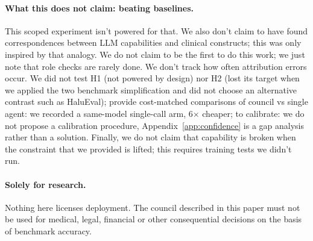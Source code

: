 \paragraph{What this does not claim: beating baselines.}
This scoped experiment isn't powered for that. We also don't claim to have found correspondences
between LLM capabilities and clinical constructs; this was only inspired by that analogy. We do not
claim to be the first to do this work; we just note that role checks are rarely done. We don't track
how often attribution errors occur. We did not test H1 (not powered by design) nor H2 (lost its
target when we applied the two benchmark simplification and did not choose an alternative contrast
such as HaluEval); provide cost-matched comparisons of council vs single agent: we recorded a
same-model single-call arm, 6$\times$ cheaper; to calibrate: we do not propose a calibration
procedure, Appendix~\ref{app:confidence} is a gap analysis rather than a solution. Finally, we do
not claim that capability is broken when the constraint that we provided is lifted; this requires
training tests we didn't run.

\paragraph{Solely for research.}
Nothing here licenses deployment. The council described in this paper must not be used for medical,
legal, financial or other consequential decisions on the basis of benchmark accuracy.
